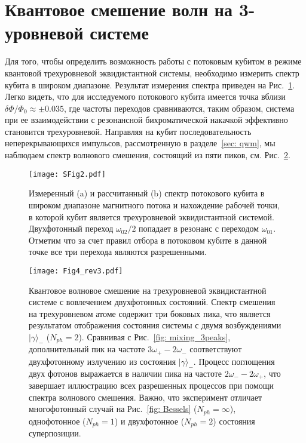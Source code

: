 \section{Квантовое смешение волн на 3-уровневой системе}
Для того, чтобы определить возможность работы с потоковым кубитом в режиме квантовой трехуровневой эквидистантной системы, необходимо измерить спектр кубита в широком диапазоне. Результат измерения спектра приведен на Рис.~\ref{fig: flux_spectr_3ls}. Легко видеть, что для исследуемого потокового кубита имеется точка вблизи $\delta\Phi/\Phi_0 \approx  \pm 0.035$, где частоты переходов сравниваются, таким образом, система при ее взаимодействии с резонансной бихроматической накачкой эффективно становится трехуровневой. Направляя на кубит последовательность неперекрывающихся импульсов, рассмотренную в разделе~\ref{sec: qwm}, мы наблюдаем спектр волнового смешения, состоящий из пяти пиков, см. Рис.~\ref{fig: qwm_3ls}. 
\begin{figure}
	\centering
	\texttt{[image: SFig2.pdf]}
	\caption[Спектр потокового кубита в широком диапазоне магнитного потока и нахождение рабочей точки, в которой кубит является трехуровневой эквидистантной системой.]{Измеренный (a) и рассчитанный (b) спектр потокового кубита в широком диапазоне магнитного потока и нахождение рабочей точки, в которой кубит является трехуровневой эквидистантной системой. Двухфотонный переход $\omega_{02}/2$ попадает в резонанс с переходом $\omega_{01}$. Отметим что за счет правил отбора в потоковом кубите в данной точке все три перехода являются разрешенными.}
	\label{fig: flux_spectr_3ls}
\end{figure}
\begin{figure}
	\centering
	\texttt{[image: Fig4\_rev3.pdf]}
	\caption[Спектр квантового волнового смешения на трехуровневой эквидистантной системе.]{Квантовое волновое смешение на трехуровневой эквидистантной системе с вовлечением двухфотонных состояний. Спектр смешения на трехуровневом атоме содержит три боковых пика, что является результатом отображения состояния системы с двумя возбуждениями $|\gamma\rangle_-$ ($N_{ph} = 2$). Сравнивая с Рис.~\ref{fig: mixing_3peaks}, дополнительный пик на частоте $3\omega_+ - 2\omega_-$ соответствуют двухфотонному излучению из состояния $|\gamma\rangle_-$. Процесс поглощения двух фотонов выражается в наличии пика на частоте $2\omega_- - 2\omega_+$, что завершает иллюстрацию всех разрешенных процессов при помощи спектра волнового смешения. Важно, что эксперимент отличает многофотонный случай на Рис.~\ref{fig: Bessels} ($N_{ph} = \infty$), однофотонное ($N_{ph} = 1$) и двухфотонное ($N_{ph} = 2$) состояния суперпозиции.}
	\label{fig: qwm_3ls}
\end{figure}
